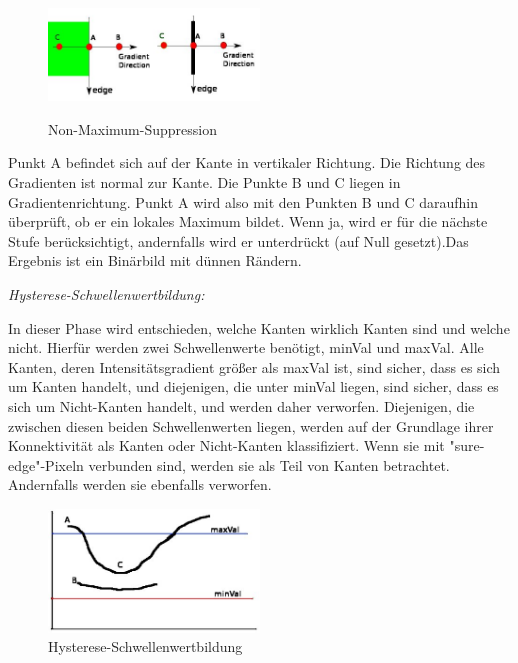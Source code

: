 \begin{compactenum}
\begin{compactenum}
        \begin{figure}[H]
            \centering
            \includegraphics[width=0.5\textwidth]{pics/nms.jpg}
            \caption{Non-Maximum-Suppression}
            \cite{NMSPic}
            \label{fig:anpr:edge:nms}
            \end{figure}
            Punkt A befindet sich auf der Kante in vertikaler Richtung. Die Richtung des Gradienten ist normal zur Kante. Die Punkte B und C liegen in Gradientenrichtung. Punkt A wird also mit den Punkten B und C daraufhin überprüft, ob er ein lokales Maximum bildet. Wenn ja, wird er für die nächste Stufe berücksichtigt, andernfalls wird er unterdrückt (auf Null gesetzt).Das Ergebnis ist ein Binärbild mit dünnen Rändern.
    \end{compactenum}
    \item \textit{Hysterese-Schwellenwertbildung: }
    \begin{compactenum}
        \item  In dieser Phase wird entschieden, welche Kanten wirklich Kanten sind und welche nicht. Hierfür werden zwei Schwellenwerte benötigt, minVal und maxVal. Alle Kanten, deren Intensitätsgradient größer als maxVal ist, sind sicher, dass es sich um Kanten handelt, und diejenigen, die unter minVal liegen, sind sicher, dass es sich um Nicht-Kanten handelt, und werden daher verworfen. Diejenigen, die zwischen diesen beiden Schwellenwerten liegen, werden auf der Grundlage ihrer Konnektivität als Kanten oder Nicht-Kanten klassifiziert. Wenn sie mit "sure-edge"-Pixeln verbunden sind, werden sie als Teil von Kanten betrachtet. Andernfalls werden sie ebenfalls verworfen.
        \begin{figure}[H]
            \centering
            \includegraphics[width=0.5\textwidth]{pics/hysteresis.jpg}
            \caption{Hysterese-Schwellenwertbildung}

\end{figure}
\end{compactenum}
\end{compactenum}
